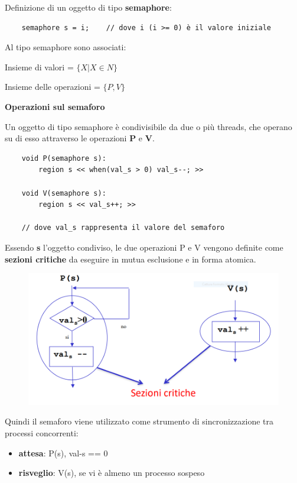 \documentclass{article}
\begin{document}
Definizione di un oggetto di tipo \textbf{semaphore}:
\begin{lstlisting}
    semaphore s = i;    // dove i (i >= 0) è il valore iniziale
\end{lstlisting}

Al tipo semaphore sono associati:
\begin{center}
    Insieme di valori = $\{X | X \in N\}$
    \vspace{3mm}

    Insieme delle operazioni = $\{P, V\}$
\end{center}

\vspace{5mm}
\textbf{Operazioni sul semaforo}
\vspace{3mm}

Un oggetto di tipo semaphore è condivisibile da due o più threads, che operano su di esso attraverso le operazioni \textbf{P} e \textbf{V}.

\begin{lstlisting}
    void P(semaphore s):
        region s << when(val_s > 0) val_s--; >>

    void V(semaphore s):
        region s << val_s++; >>

    // dove val_s rappresenta il valore del semaforo
\end{lstlisting}

Essendo \textbf{s} l'oggetto condiviso, le due operazioni P e V vengono definite come \textbf{sezioni critiche} da eseguire in mutua esclusione e in forma atomica.

\begin{figure}[htbp]
    \centering
    \includegraphics[width=0.50\columnwidth]{imgs/operazioni_semaforo.PNG}
\end{figure}

Quindi il semaforo viene utilizzato come strumento di sincronizzazione tra processi concorrenti:
\begin{itemize}
    \item \textbf{attesa}: P(s), val-s == 0
    \item \textbf{risveglio}: V(s), se vi è almeno un processo sospeso
\end{itemize}
\end{document}
